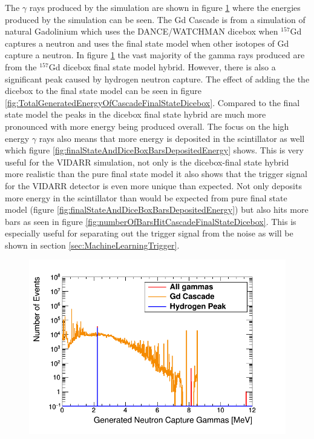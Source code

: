 The $\gamma$ rays produced by the simulation are shown in figure \ref{fig:gdCascadeVsAllGammas} where the energies produced by the simulation can be seen. The Gd Cascade is from a simulation of natural Gadolinium which uses the DANCE/WATCHMAN dicebox when $^{157}$Gd captures a neutron and uses the final state model when other isotopes of Gd capture a neutron. In figure \ref{fig:gdCascadeVsAllGammas} the vast majority of the gamma rays produced are from the $^{157}$Gd dicebox final state model hybrid. However, there is also a significant peak caused by hydrogen neutron capture. The effect of adding the the dicebox to the final state model can be seen in figure \ref{fig:TotalGeneratedEnergyOfCascadeFinalStateDicebox}. Compared to the final state model the peaks in the dicebox final state hybrid are much more pronounced with more energy being produced overall. The focus on the high energy $\gamma$ rays also means that more energy is deposited in the scintillator as well which figure \ref{fig:finalStateAndDiceBoxBarsDepositedEnergy} shows. This is very useful for the VIDARR simulation, not only is the dicebox-final state hybrid more realistic than the pure final state model it also shows that the trigger signal for the VIDARR detector is even more unique than expected. Not only deposits more energy in the scintillator than would be expected from pure final state model (figure \ref{fig:finalStateAndDiceBoxBarsDepositedEnergy}) but also hits more bars as seen in figure \ref{fig:numberOfBarsHitCascadeFinalStateDicebox}. This is especially useful for separating out the trigger signal from the noise as will be shown in section \ref{sec:MachineLearningTrigger}.

\begin{figure}[htbp]
 \centering
 \includegraphics[width=0.7\linewidth]{Chapter4/Figs/Raster/gadolinium/gdCascadeVsAllGammas.png}
 \label{fig:gdCascadeVsAllGammas}
\end{figure}

